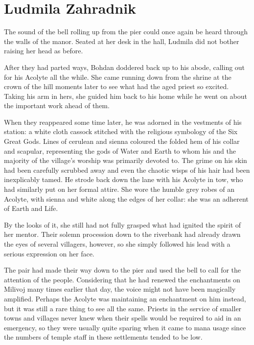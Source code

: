 \chapter{Ludmila Zahradnik}

The sound of the bell rolling up from the pier could once again be heard through the walls of the manor. Seated at her desk in the hall, Ludmila did not bother raising her head as before.

 

After they had parted ways, Bohdan doddered back up to his abode, calling out for his Acolyte all the while. She came running down from the shrine at the crown of the hill moments later to see what had the aged priest so excited. Taking his arm in hers, she guided him back to his home while he went on about the important work ahead of them.

 

When they reappeared some time later, he was adorned in the vestments of his station: a white cloth cassock stitched with the religious symbology of the Six Great Gods. Lines of cerulean and sienna coloured the folded hem of his collar and scapular, representing the gods of Water and Earth to whom his and the majority of the village’s worship was primarily devoted to. The grime on his skin had been carefully scrubbed away and even the chaotic wisps of his hair had been inexplicably tamed. He strode back down the lane with his Acolyte in tow, who had similarly put on her formal attire. She wore the humble grey robes of an Acolyte, with sienna and white along the edges of her collar: she was an adherent of Earth and Life.

 

By the looks of it, she still had not fully grasped what had ignited the spirit of her mentor. Their solemn procession down to the riverbank had already drawn the eyes of several villagers, however, so she simply followed his lead with a serious expression on her face.

 

The pair had made their way down to the pier and used the bell to call for the attention of the people. Considering that he had renewed the enchantments on Milivoj many times earlier that day, the voice might not have been magically amplified. Perhaps the Acolyte was maintaining an enchantment on him instead, but it was still a rare thing to see all the same. Priests in the service of smaller towns and villages never knew when their spells would be required to aid in an emergency, so they were usually quite sparing when it came to mana usage since the numbers of temple staff in these settlements tended to be low.


